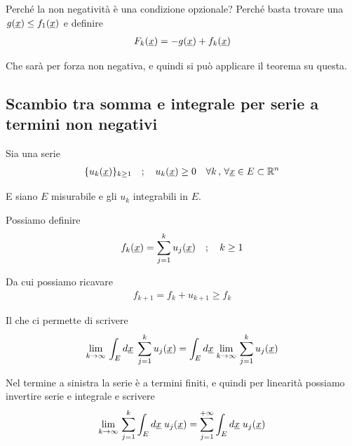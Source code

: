 Perché la non negatività è una condizione opzionale? Perché basta trovare una $g(\underline{x})\leq f_1(\underline{x})$ e definire
\begin{align}
	F_k(\underline{x})= -g(\underline{x}) + f_k(\underline{x})
\end{align}

Che sarà per forza non negativa, e quindi si può applicare il teorema su questa.

\begin{figure}[!htb]
\end{figure}

\subsection{Scambio tra somma e integrale per serie a termini non negativi}

Sia una serie
\begin{align}
	\{u_k(\underline{x})\}_{k\geq 1} \quad ; \quad u_k(\underline{x}) \geq 0 \quad \forall k \, , \, \forall \underline{x} \in E \subset \mathbb{R}^n
\end{align}

E siano $E$ misurabile e gli $u_k$ integrabili in $E$. 

Possiamo definire
\begin{align}
	f_k(\underline{x}) = \sum_{j=1}^{k} u_j(\underline{x}) \quad ; \quad k \geq 1
\end{align}

Da cui possiamo ricavare
\begin{align}
	f_{k+1} = f_k + u_{k+1} \geq f_k
\end{align}

Il che ci permette di scrivere
\begin{align}
	\underset{k \rightarrow \infty}{\lim} \, \int_{E} d\underline{x} \; \sum_{j=1}^{k} u_j(\underline{x}) = 
	\int_{E} d\underline{x} \; \underset{k \rightarrow \infty}{\lim} \,\sum_{j=1}^{k} u_j(\underline{x})
\end{align}

Nel termine a sinistra la serie è a termini finiti, e quindi per linearità possiamo invertire serie e integrale e scrivere
\begin{align}
	\underset{k \rightarrow \infty}{\lim} \,  \sum_{j=1}^{k} \int_{E} d\underline{x} \; u_j(\underline{x}) = \sum_{j=1}^{+\infty} \int_{E} d\underline{x} \; u_j(\underline{x}) \end{align}


